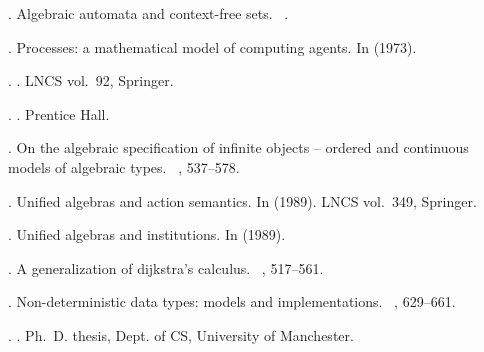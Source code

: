 {\begin{thebibliography}{}
 .
\newblock Algebraic automata and context-free sets.
\newblock {}~.

 .
\newblock Processes: a mathematical model of computing agents.
\newblock In  (1973).

 .
\newblock {}.
\newblock LNCS vol.~92, Springer.

 .
\newblock {}.
\newblock Prentice Hall.

 .
\newblock On the algebraic specification of infinite objects -- ordered and
  continuous models of algebraic types.
\newblock {}~, 537--578.

 .
\newblock Unified algebras and action semantics.
\newblock In  (1989). LNCS vol.~349, Springer.

 .
\newblock Unified algebras and institutions.
\newblock In  (1989).

 .
\newblock A generalization of dijkstra's calculus.
\newblock {}~, 517--561.

 .
\newblock Non-deterministic data types: models and implementations.
\newblock {}~, 629--661.

 .
\newblock {}.
\newblock Ph.\ D. thesis, Dept. of CS, University of Manchester.


\end{thebibliography}}
